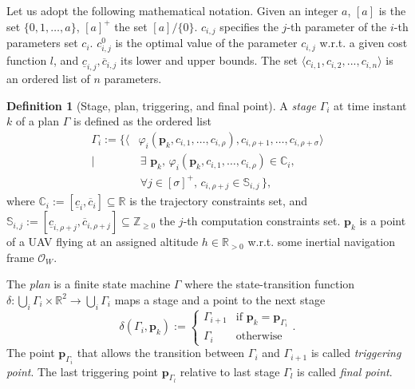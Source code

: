 \documentclass[letterpaper,10pt,conference]{ieeeconf}
\theoremstyle{definition}
\newtheorem{defn}{Definition}[section]
\begin{document}
Let us adopt the following mathematical notation. Given an integer $a$, $[a]$ is the set $\{0,1,\dots,a\}$, $[a]^+$ the set $[a]/\{0\}$. $c_{i,j}$ specifies the $j$-th parameter of the $i$-th parameters set $c_i$. $c_{i,j}^0$ is the optimal value of the parameter $c_{i,j}$ w.r.t. a given cost function $l$, and $\underline{c}_{i,j},\overline{c}_{i,j}$ its lower and upper bounds. The set $\langle c_{i,1},c_{i,2},...,c_{i,n}\rangle$ is an ordered list of $n$ parameters.

\begin{defn}[Stage, plan, triggering, and final point]\label{def:mission}
  A \emph{stage} $\Gamma_i$ at time instant $k$ of a plan $\Gamma$ is defined as the ordered list
  \begin{equation}\label{eq:mission}\begin{split}
    \Gamma_i:=\{\langle&\varphi_i(\mathbf{p}_k,c_{i,1},\dots,c_{i,\rho}),c_{i,\rho+1},\dots,c_{i,\rho+\sigma}\rangle\\\mid
    &\,\exists\,\,\mathbf{p}_k,\,\varphi_i(\mathbf{p}_k,c_{i,1},\dots,c_{i,\rho})\in\mathbb{C}_i,\,\\
      &\,\forall j\in[\sigma]^+,\,c_{i,\rho+j}\in\mathbb{S}_{i,j}\,\},
  \end{split}\end{equation}
  where $\mathbb{C}_i:=[\underline{c}_i,\overline{c}_i]\subseteq\mathbb{R}$ is the trajectory constraints set, and $\mathbb{S}_{i,j}:=[\underline{c}_{i,\rho+j},\overline{c}_{i,\rho+j}]\subseteq\mathbb{Z}_{\geq 0}$ the $j$-th computation constraints set. $\mathbf{p}_k$ is a point of a UAV flying at an assigned altitude $h\in\mathbb{R}_{>0}$ w.r.t. some inertial navigation frame $\mathcal{O}_W$.

  The \emph{plan} is a finite state machine $\Gamma$ where the state-transition function $\delta:\bigcup_i{\Gamma_i}\times\mathbb{R}^2\rightarrow\bigcup_i{\Gamma_i}$ maps a stage and a point to the next stage
  \begin{equation*}\delta(\Gamma_i,\mathbf{p}_k):=\begin{cases}
    \Gamma_{i+1} & \text{if }\mathbf{p}_k=\mathbf{p}_{\Gamma_i}\\
    \Gamma_i & \text{otherwise}
  \end{cases}.\end{equation*}
  The point $\mathbf{p}_{\Gamma_{i}}$ that allows the transition between $\Gamma_i$ and $\Gamma_{i+1}$ is called \emph{triggering point}. The last triggering point $\mathbf{p}_{\Gamma_{l}}$ relative to last stage $\Gamma_l$ is called \emph{final point}.
\end{defn}
\end{document}
